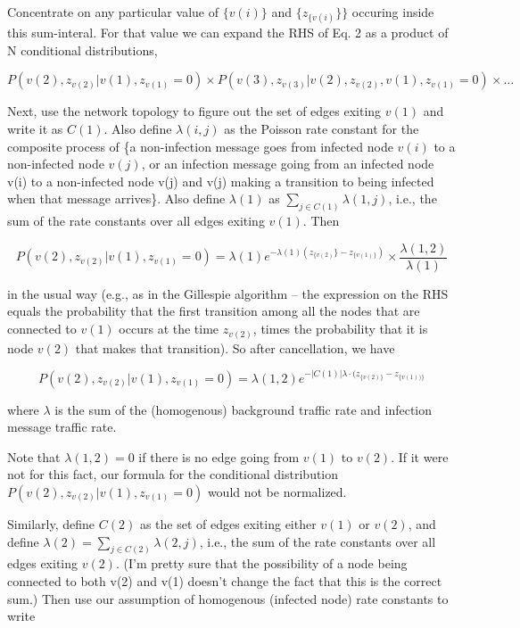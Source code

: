 \documentclass{article}
\begin{document}
	Concentrate on any particular value of $\{v(i)\}$ and $\{z_{\{v(i)}\}\}$ occuring
	inside this sum-interal. For that value we can expand the RHS of Eq. 2
	as a product of N conditional distributions,

	\begin{equation*}
		P(v(2), z_{v(2)} |  v(1), z_{v(1)} = 0)    \times  
		P(v(3), z_{v(3)} |  v(2), z_{v(2)}, v(1), z_{v(1)} = 0)    \times  \ldots
	\end{equation*}

	Next, use the network topology to figure out the set of edges exiting
	$v(1)$ and write it as $C(1)$. Also define $\lambda(i,j)$ as the Poisson rate
	constant for the composite process of \{a non-infection message goes
	from infected node $v(i)$ to a non-infected node $v(j)$, or an infection
	message going from an infected node v(i) to a non-infected node v(j)
	and v(j) making a transition to being infected when that message
	arrives\}.  Also define $\lambda(1)$ as $\sum_{j \in C(1)} \lambda(1,j)$,
	i.e., the sum of the rate constants over all edges exiting $v(1)$. Then

	\begin{equation*}
		P(v(2), z_{v(2)} | v(1), z_{v(1)} = 0)  =
		\lambda(1) e^{- \lambda(1) (z_{\{v(2)}\} - z_{\{v(1)\}})} 
		\times \frac{\lambda(1,2)}{\lambda(1)}
	\end{equation*}

	in the usual way (e.g., as in the Gillespie algorithm -- the
	expression on the RHS equals the probability that the first transition
	among all the nodes that are connected to $v(1)$ occurs at the time
	$z_{v(2)}$, times the probability that it is node $v(2)$ that makes that
	transition). So after cancellation, we have
	
	\begin{equation*}
	P(v(2), z_{v(2)} | v(1), z_{v(1)} = 0) =
		\lambda(1, 2) e^{-|C(1)| \lambda \cdot (z_{\{v(2)\}} - z_{\{v(1))\}}}
	\end{equation*}

	where $\lambda$ is the sum of the (homogenous) background traffic rate
	and infection message traffic rate. 

	Note that $\lambda(1, 2) = 0$ if there is no edge going from $v(1)$ to
	$v(2)$. If it were not for this fact, our formula for the conditional
	distribution $P(v(2), z_{v(2)} | v(1), z_{v(1)} = 0)$ would not be
	normalized.

	Similarly, define $C(2)$ as the set of edges exiting either $v(1)$ or
	$v(2)$, and define $\lambda(2) = \sum_{j \in C(2)} \lambda(2,j)$, i.e., the
	sum of the rate constants over all edges exiting $v(2)$. (I'm pretty
	sure that the possibility of a node being connected to both v(2) and
	v(1) doesn't change the fact that this is the correct sum.)  Then use
	our assumption of homogenous (infected node) rate constants to write
\end{document}
